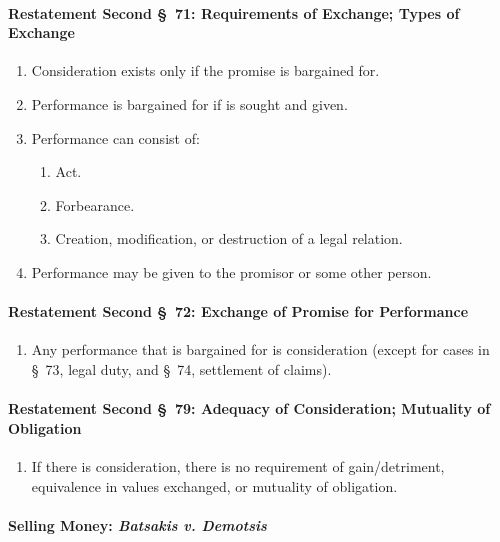 \paragraph{Restatement Second \S\ 71: Requirements of Exchange; Types of 
Exchange}

\begin{enumerate}
    \item Consideration exists only if the promise is bargained for.
    \item Performance is bargained for if is sought and given.
    \item Performance can consist of:
    \begin{enumerate}
        \item Act.
        \item Forbearance.
        \item Creation, modification, or destruction of a legal relation.
    \end{enumerate}
    \item Performance may be given to the promisor or some other person.
\end{enumerate}

\paragraph{Restatement Second \S\ 72: Exchange of Promise for Performance}

\begin{enumerate}
    \item Any performance that is bargained for is consideration (except for 
    cases in \S\ 73, legal duty, and \S\ 74, settlement of claims).
\end{enumerate}

\paragraph{Restatement Second \S\ 79: Adequacy of Consideration; Mutuality of 
Obligation}

\begin{enumerate}
    \item If there is consideration, there is no requirement of 
    gain/detriment, equivalence in values exchanged, or mutuality of 
    obligation.
\end{enumerate}

\paragraph{Selling Money: \emph{Batsakis v. Demotsis}}

